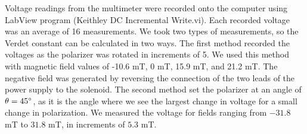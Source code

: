 \documentclass[prb,preprint]{revtex4-1}
\begin{document}
{Voltage readings from the multimeter were recorded onto the computer using LabView program (Keithley DC Incremental Write.vi). Each recorded voltage was an average of 16 measurements. We took two types of measurements, so the Verdet constant can be calculated in two ways.  The first method recorded the voltages as the polarizer was rotated in increments of 5\degree. We used this method with magnetic field values of -10.6 mT, 0 mT, 15.9 mT, and 21.2 mT. The negative field was generated by reversing the connection of the two leads of the power supply to the solenoid. The second method set the polarizer at an angle of $\theta = 45\degree$, as it is the angle where we see the largest change in voltage for a small change in polarization. We measured the voltage for fields ranging from $-31.8$ mT to $31.8$ mT, in increments of $5.3$ mT.
}
\end{document}
